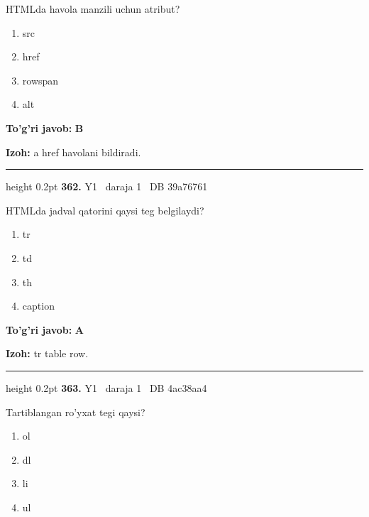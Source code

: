 \documentclass[10pt,a4paper,oneside]{article}
\begin{document}
HTMLda havola manzili uchun atribut?
\begin{enumerate}[label=\Alph*),leftmargin=9mm]
\item src
\item href
\item rowspan
\item alt
\end{enumerate}
\begin{tcolorbox}[enhanced,breakable,colback=teal!4,colframe=teal!45!black,boxrule=0.45pt,arc=1.2mm,left=2.8mm,right=2.8mm,top=2mm,bottom=2mm,before skip=2mm,after skip=2mm]
\textbf{\color{teal}To'g'ri javob:} \textbf{B}
\par\smallskip
\textbf{Izoh:} a href havolani bildiradi.
\end{tcolorbox}
\vspace{2mm}\hrule height 0.2pt \vspace{4mm}
\hypertarget{q362}{\textbf{\color{ink}362.}}  {\color{muted}\scriptsize Y1 \textbullet\ daraja 1 \textbullet\ DB 39a76761}
\par
HTMLda jadval qatorini qaysi teg belgilaydi?
\begin{enumerate}[label=\Alph*),leftmargin=9mm]
\item tr
\item td
\item th
\item caption
\end{enumerate}
\begin{tcolorbox}[enhanced,breakable,colback=teal!4,colframe=teal!45!black,boxrule=0.45pt,arc=1.2mm,left=2.8mm,right=2.8mm,top=2mm,bottom=2mm,before skip=2mm,after skip=2mm]
\textbf{\color{teal}To'g'ri javob:} \textbf{A}
\par\smallskip
\textbf{Izoh:} tr table row.
\end{tcolorbox}
\vspace{2mm}\hrule height 0.2pt \vspace{4mm}
\hypertarget{q363}{\textbf{\color{ink}363.}}  {\color{muted}\scriptsize Y1 \textbullet\ daraja 1 \textbullet\ DB 4ac38aa4}
\par
Tartiblangan ro'yxat tegi qaysi?
\begin{enumerate}[label=\Alph*),leftmargin=9mm]
\item ol
\item dl
\item li
\item ul
\end{enumerate}
\end{document}
